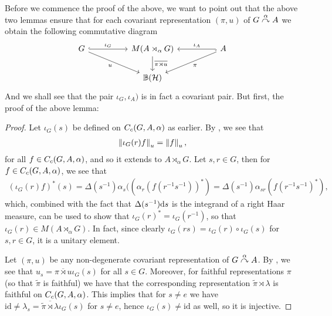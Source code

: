 Before we commence the proof of the above, we want to point out that the above two lemmas ensure that for each covariant representation $(\pi , u)$ of $G \stackrel{\alpha}{\curvearrowright} A$ we obtain the following commutative diagram
\begin{equation}
\begin{tikzcd}
	G \arrow[rr, "\iota_G", hook] \arrow[rrd, "u"'] && M(A \rtimes_\alpha G) \arrow[d, "\overline{\pi \rtimes u }"] && A \arrow[ll,"\iota_A"',hook] \arrow[lld, "\pi"]\\
	& &\mathbb{B}(\H)&&
\end{tikzcd}
\label{diag:iotacom}
\end{equation}
And we shall see that the pair $\iota_G, \iota_A)$ is in fact a covariant pair. But first, the proof of the above lemma:
\begin{proof}
Let $\iota_G(s)$ be defined on $C_c(G,A,\alpha)$ as earlier. By , we see that
\begin{align*}
	\left\lVert \iota_G(r) f \right\rVert_u = \left\lVert f \right\rVert_u,
\end{align*}
for all $f \in C_c(G,A,\alpha)$, and so it extends to $A \rtimes_\alpha G$. Let $s,r \in G$, then for $f \in C_c(G,A,\alpha)$, we see that
\begin{align*}
	(\iota_G(r) f)^*(s) = \Delta(s^{-1}) \alpha_s ( (\alpha_r(f(r^{-1}s^{-1}))^*)= \Delta(s^{-1}) \alpha_{sr}(f(r^{-1}s^{-1})^*),
\end{align*}
which, combined with the fact that $\Delta(s^{-1}) \mathrm{d} s$ is the integrand of a right Haar measure, can be used to show that $\iota_G(r)^* = \iota_G(r^{-1})$, so that $\iota_G(r) \in M(A \rtimes_\alpha G)$. In fact, since clearly $\iota_G(rs) = \iota_G(r) \circ \iota_G(s)$ for $s,r \in G$, it is a unitary element.

Let $(\pi,u)$ be any non-degenerate covariant representation of $G \stackrel{\alpha}{\curvearrowright} A$. By , we see that $u_s  = \overline{ \pi \rtimes u} \iota_G(s)$ for all $ s \in G$. Moreover, for faithful representations $\pi$ (so that $\tilde \pi$ is faithful) we have that the corresponding representation $\tilde \pi \rtimes \lambda$ is faithful on $C_c(G,A,\alpha)$. This implies that for $s \neq e$ we have $\mathrm{id} \neq \lambda_s = \overline{\tilde \pi \rtimes \lambda} \iota_G(s)$ for $s \neq e$, hence $\iota_G(s) \neq \mathrm{id}$ as well, so it is injective.
	


\end{proof}
